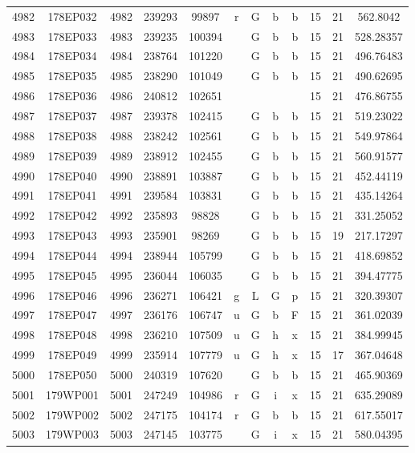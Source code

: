 \begin{tabular}{|*{12}{c|}}
4982 & 178EP032 & 4982 & 239293 & 99897 & r & G & b & b & 15 & 21 & 562.8042 \\ 
4983 & 178EP033 & 4983 & 239235 & 100394 &  & G & b & b & 15 & 21 & 528.28357 \\ 
4984 & 178EP034 & 4984 & 238764 & 101220 &  & G & b & b & 15 & 21 & 496.76483 \\ 
4985 & 178EP035 & 4985 & 238290 & 101049 &  & G & b & b & 15 & 21 & 490.62695 \\ 
4986 & 178EP036 & 4986 & 240812 & 102651 &  &  &  &  & 15 & 21 & 476.86755 \\ 
4987 & 178EP037 & 4987 & 239378 & 102415 &  & G & b & b & 15 & 21 & 519.23022 \\ 
4988 & 178EP038 & 4988 & 238242 & 102561 &  & G & b & b & 15 & 21 & 549.97864 \\ 
4989 & 178EP039 & 4989 & 238912 & 102455 &  & G & b & b & 15 & 21 & 560.91577 \\ 
4990 & 178EP040 & 4990 & 238891 & 103887 &  & G & b & b & 15 & 21 & 452.44119 \\ 
4991 & 178EP041 & 4991 & 239584 & 103831 &  & G & b & b & 15 & 21 & 435.14264 \\ 
4992 & 178EP042 & 4992 & 235893 & 98828 &  & G & b & b & 15 & 21 & 331.25052 \\ 
4993 & 178EP043 & 4993 & 235901 & 98269 &  & G & b & b & 15 & 19 & 217.17297 \\ 
4994 & 178EP044 & 4994 & 238944 & 105799 &  & G & b & b & 15 & 21 & 418.69852 \\ 
4995 & 178EP045 & 4995 & 236044 & 106035 &  & G & b & b & 15 & 21 & 394.47775 \\ 
4996 & 178EP046 & 4996 & 236271 & 106421 & g & L & G & p & 15 & 21 & 320.39307 \\ 
4997 & 178EP047 & 4997 & 236176 & 106747 & u & G & b & F & 15 & 21 & 361.02039 \\ 
4998 & 178EP048 & 4998 & 236210 & 107509 & u & G & h & x & 15 & 21 & 384.99945 \\ 
4999 & 178EP049 & 4999 & 235914 & 107779 & u & G & h & x & 15 & 17 & 367.04648 \\ 
5000 & 178EP050 & 5000 & 240319 & 107620 &  & G & b & b & 15 & 21 & 465.90369 \\ 
5001 & 179WP001 & 5001 & 247249 & 104986 & r & G & i & x & 15 & 21 & 635.29089 \\ 
5002 & 179WP002 & 5002 & 247175 & 104174 & r & G & b & b & 15 & 21 & 617.55017 \\ 
5003 & 179WP003 & 5003 & 247145 & 103775 &  & G & i & x & 15 & 21 & 580.04395 \\ 

\end{tabular}
